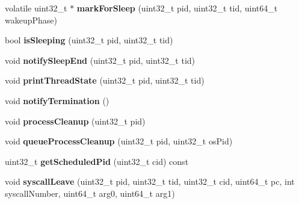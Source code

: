 \begin{DoxyCompactItemize}
\item 
\hypertarget{classScheduler_a8140a51d4ef2b55bc29b819f28f76b5e}{volatile uint32\-\_\-t $\ast$ {\bfseries mark\-For\-Sleep} (uint32\-\_\-t pid, uint32\-\_\-t tid, uint64\-\_\-t wakeup\-Phase)}\label{classScheduler_a8140a51d4ef2b55bc29b819f28f76b5e}

\item 
\hypertarget{classScheduler_a59ed4da4a484b2a736e06f32f62b6110}{bool {\bfseries is\-Sleeping} (uint32\-\_\-t pid, uint32\-\_\-t tid)}\label{classScheduler_a59ed4da4a484b2a736e06f32f62b6110}

\item 
\hypertarget{classScheduler_a9b2f33234735461120ecfd51d43bf107}{void {\bfseries notify\-Sleep\-End} (uint32\-\_\-t pid, uint32\-\_\-t tid)}\label{classScheduler_a9b2f33234735461120ecfd51d43bf107}

\item 
\hypertarget{classScheduler_a923741f4201a1c333fc2330f9f47a946}{void {\bfseries print\-Thread\-State} (uint32\-\_\-t pid, uint32\-\_\-t tid)}\label{classScheduler_a923741f4201a1c333fc2330f9f47a946}

\item 
\hypertarget{classScheduler_aa2e98eac3b53295634ae8205415dfbc9}{void {\bfseries notify\-Termination} ()}\label{classScheduler_aa2e98eac3b53295634ae8205415dfbc9}

\item 
\hypertarget{classScheduler_ad640338d9b2dabbce9a8cffd3d7646f6}{void {\bfseries process\-Cleanup} (uint32\-\_\-t pid)}\label{classScheduler_ad640338d9b2dabbce9a8cffd3d7646f6}

\item 
\hypertarget{classScheduler_af66820699b9a767d829e8e0972d9ae12}{void {\bfseries queue\-Process\-Cleanup} (uint32\-\_\-t pid, uint32\-\_\-t os\-Pid)}\label{classScheduler_af66820699b9a767d829e8e0972d9ae12}

\item 
\hypertarget{classScheduler_a03e71af59d59d45c7e0634f1755bbf53}{uint32\-\_\-t {\bfseries get\-Scheduled\-Pid} (uint32\-\_\-t cid) const }\label{classScheduler_a03e71af59d59d45c7e0634f1755bbf53}

\item 
\hypertarget{classScheduler_a739d30a22b9607531ac2edd7067de6a4}{void {\bfseries syscall\-Leave} (uint32\-\_\-t pid, uint32\-\_\-t tid, uint32\-\_\-t cid, uint64\-\_\-t pc, int syscall\-Number, uint64\-\_\-t arg0, uint64\-\_\-t arg1)}\label{classScheduler_a739d30a22b9607531ac2edd7067de6a4}


\end{DoxyCompactItemize}
